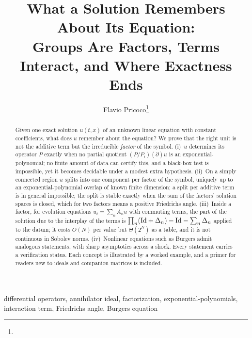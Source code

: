 



\title{What a Solution Remembers About Its Equation:\\Groups Are Factors, Terms Interact, and Where Exactness Ends}
\author{Flavio Pricoco\thanks{}}


\maketitle

\begin{abstract}
Given one exact solution $u(t,x)$ of an unknown linear equation with constant coefficients, what does $u$ remember about the
equation? We prove that the right unit is not the additive term but the irreducible \emph{factor} of the symbol. (i)~$u$
determines its operator $P$ exactly when no partial quotient $(P/P_i)(\partial)u$ is an exponential-polynomial; no finite amount of
data can certify this, and a black-box test is impossible, yet it becomes decidable under a modest extra hypothesis. (ii)~On a simply connected region $u$ splits into one
component per factor of the symbol, uniquely up to an exponential-polynomial overlap of known finite dimension; a split per additive term is in general impossible; the split is
stable exactly when the sum of the factors' solution spaces is closed, which for two factors means a positive Friedrichs angle. (iii)~Inside a factor, for evolution equations $u_t=\sum_nA_nu$ with commuting terms, the part of the solution
due to the interplay of the terms is $\prod_n(\mathrm{Id}+\Delta_n)-\mathrm{Id}-\sum_n\Delta_n$ applied to the datum; it costs $O(N)$ per value but $\Theta(2^N)$ as a table, and it
is not continuous in Sobolev norms. (iv)~Nonlinear equations such as Burgers admit analogous statements, with sharp asymptotics across a shock. Every statement carries a verification status.
Each concept is illustrated by a worked example, and a primer for readers new to ideals and companion matrices is included.
\end{abstract}

\begin{keywords}
differential operators, annihilator ideal, factorization, exponential-polynomials, interaction term, Friedrichs angle, Burgers equation
\end{keywords}

